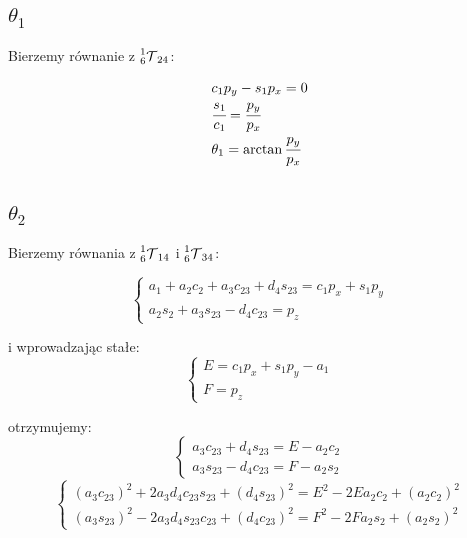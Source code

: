 \documentclass[]{article}
\newcommand\T{\mathcal{T}}
\begin{document}
\subsection{$\theta_1$}
Bierzemy równanie z $\prescript{1}{6}{\T}_{24}$:

\begin{equation}\begin{array}{l}
c_1p_y - s_1p_x = 0 \\
\cfrac{s_1}{c_1} = \cfrac{p_y}{p_x} \\
\theta_1 = \arctan \cfrac{p_y}{p_x}
\end{array}\end{equation}

\subsection{$\theta_2$}
Bierzemy równania z $\prescript{1}{6}{\T}_{14}$ i $\prescript{1}{6}{\T}_{34}$:

\begin{equation}
\label{eq:theta2}
\left\{\begin{array}{l}
a_1 + a_2c_2 + a_3c_{23} + d_4s_{23} = c_1p_x + s_1p_y \\
a_2s_2 + a_3s_{23} - d_4c_{23} = p_z
\end{array}\right.\end{equation}

i wprowadzając stałe:
\begin{equation}\left\{\begin{array}{l}
E = c_1p_x + s_1p_y - a_1 \\
F = p_z
\end{array}\right.\end{equation}

otrzymujemy:
\begin{equation}\left\{\begin{array}{l}
a_3c_{23} + d_4s_{23} = E - a_2c_2 \\
a_3s_{23} - d_4c_{23} = F - a_2s_2
\end{array}\right.\end{equation}
\begin{equation}\left\{\begin{array}{l}
(a_3c_{23})^2 + 2a_3d_4c_{23}s_{23} + (d_4s_{23})^2 = E^2 - 2Ea_2c_2 + (a_2c_2)^2 \\
(a_3s_{23})^2 - 2a_3d_4s_{23}c_{23} + (d_4c_{23})^2 = F^2 - 2Fa_2s_2 + (a_2s_2)^2
\end{array}\right.\end{equation}
\end{document}
